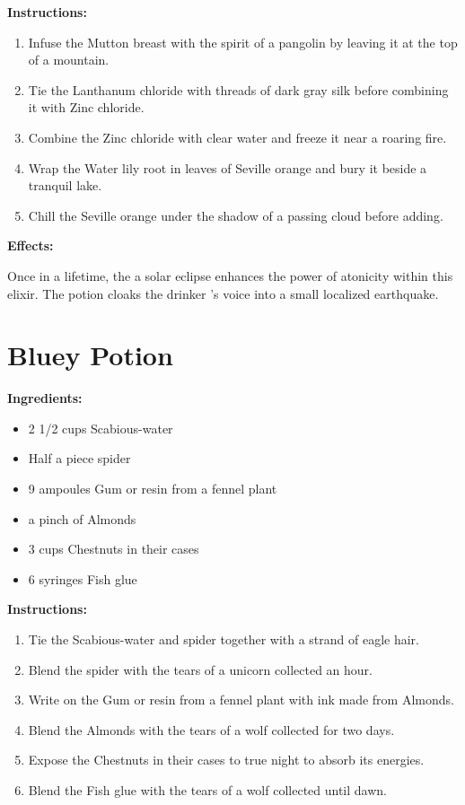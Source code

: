 \documentclass{article}
\begin{document}
\textbf{Instructions:}

\begin{enumerate}
  \item Infuse the Mutton breast with the spirit of a pangolin by leaving it at the top of a mountain.
  \item Tie the Lanthanum chloride with threads of dark gray silk before combining it with Zinc chloride.
  \item Combine the Zinc chloride with clear water and freeze it near a roaring fire.
  \item Wrap the Water lily root in leaves of Seville orange and bury it beside a tranquil lake.
  \item Chill the Seville orange under the shadow of a passing cloud before adding.
\end{enumerate}

\textbf{Effects:}

Once in a lifetime, the a solar eclipse enhances the power of atonicity within this elixir. The potion cloaks the drinker 's voice into a small localized earthquake.

\newpage
\section*{Bluey Potion}

\textbf{Ingredients:}

\begin{itemize}
  \item 2 1/2 cups Scabious-water
  \item Half a piece spider
  \item 9 ampoules Gum or resin from a fennel plant
  \item a pinch of Almonds
  \item 3 cups Chestnuts in their cases
  \item 6 syringes Fish glue
\end{itemize}

\textbf{Instructions:}

\begin{enumerate}
  \item Tie the Scabious-water and spider together with a strand of eagle hair.
  \item Blend the spider with the tears of a unicorn collected an hour.
  \item Write on the Gum or resin from a fennel plant with ink made from Almonds.
  \item Blend the Almonds with the tears of a wolf collected for two days.
  \item Expose the Chestnuts in their cases to true night to absorb its energies.
  \item Blend the Fish glue with the tears of a wolf collected until dawn.
\end{enumerate}
\end{document}
